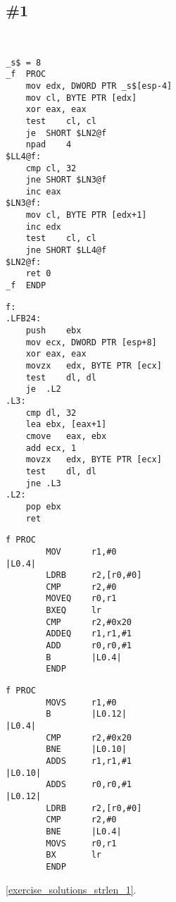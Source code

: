 \section{\Exercises}

\subsection{\Exercise \#1}
\label{exercise_strlen_1}

\WhatThisCodeDoes\

\begin{lstlisting}[caption=MSVC 2010 /Ox]
_s$ = 8			
_f	PROC
	mov	edx, DWORD PTR _s$[esp-4]
	mov	cl, BYTE PTR [edx]
	xor	eax, eax
	test	cl, cl
	je	SHORT $LN2@f
	npad	4
$LL4@f:
	cmp	cl, 32	
	jne	SHORT $LN3@f
	inc	eax
$LN3@f:
	mov	cl, BYTE PTR [edx+1]
	inc	edx
	test	cl, cl
	jne	SHORT $LL4@f
$LN2@f:
	ret	0
_f	ENDP
\end{lstlisting}

\begin{lstlisting}[caption=GCC 4.8.1 -O3]
f:
.LFB24:
	push	ebx
	mov	ecx, DWORD PTR [esp+8]
	xor	eax, eax
	movzx	edx, BYTE PTR [ecx]
	test	dl, dl
	je	.L2
.L3:
	cmp	dl, 32
	lea	ebx, [eax+1]
	cmove	eax, ebx
	add	ecx, 1
	movzx	edx, BYTE PTR [ecx]
	test	dl, dl
	jne	.L3
.L2:
	pop	ebx
	ret
\end{lstlisting}

\begin{lstlisting}[caption=Keil 5.03 (\ARMMode) -O3]
f PROC
        MOV      r1,#0
|L0.4|
        LDRB     r2,[r0,#0]
        CMP      r2,#0
        MOVEQ    r0,r1
        BXEQ     lr
        CMP      r2,#0x20
        ADDEQ    r1,r1,#1
        ADD      r0,r0,#1
        B        |L0.4|
        ENDP
\end{lstlisting}

\begin{lstlisting}[caption=Keil 5.03 (\ThumbMode) -O3]
f PROC
        MOVS     r1,#0
        B        |L0.12|
|L0.4|
        CMP      r2,#0x20
        BNE      |L0.10|
        ADDS     r1,r1,#1
|L0.10|
        ADDS     r0,r0,#1
|L0.12|
        LDRB     r2,[r0,#0]
        CMP      r2,#0
        BNE      |L0.4|
        MOVS     r0,r1
        BX       lr
        ENDP
\end{lstlisting}

\Answer\: \ref{exercise_solutions_strlen_1}.
